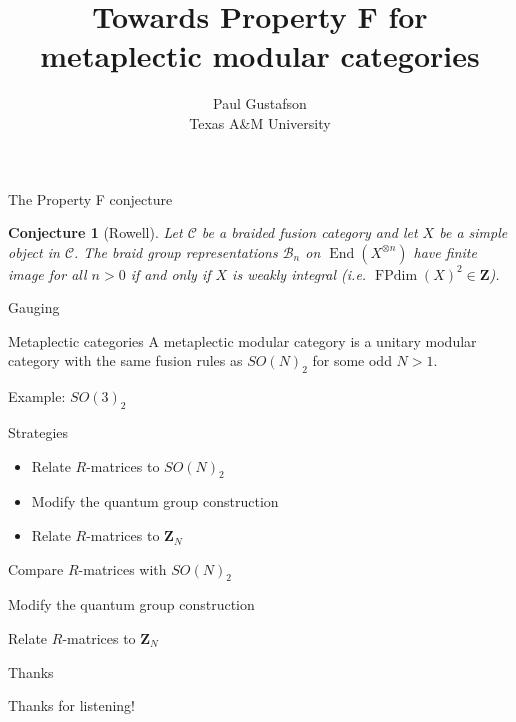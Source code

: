 \documentclass{beamer}
\title{Towards Property F for metaplectic modular categories}
\date{Paul Gustafson \\ Texas A\&M University}
\newcommand{\ZZ}{\mathbf{Z}}
\newtheorem{conj}[theorem]{Conjecture}
\DeclareMathOperator{\FPdim}{FPdim}
\DeclareMathOperator{\End}{End}
\begin{document}
\frame{\titlepage}


\begin{frame}{The Property F conjecture}
\begin{conj}[Rowell]
Let $\mathcal C$ be a braided fusion category and let $X$ be a simple object in $\mathcal C$.  The braid group representations $\mathcal B_n$ on $\End(X^{\otimes n})$ have finite image for all $n>0$ if and only if  $X$ is weakly integral (i.e. $\FPdim(X)^2 \in \mathbf Z$).
\end{conj}
\end{frame}


\begin{frame}{Gauging}
\end{frame}

\begin{frame}{Metaplectic categories}
  A metaplectic modular category is a unitary modular category with the same fusion rules as $SO(N)_2$ for some odd $N > 1$.
\end{frame}


\begin{frame}{Example: $SO(3)_2$}
\end{frame}

\begin{frame}{Strategies}
  \begin{itemize}
  \item Relate $R$-matrices to $SO(N)_2$
  \item Modify the quantum group construction
  \item Relate $R$-matrices to $\ZZ_N$
  \end{itemize}
\end{frame}

\begin{frame}{Compare $R$-matrices with $SO(N)_2$}
\end{frame}

\begin{frame}{Modify the quantum group construction}
\end{frame}

\begin{frame}{Relate $R$-matrices to $\ZZ_N$}

\end{frame}





\begin{frame}{Thanks}

Thanks for listening!

\end{frame}
\end{document}
